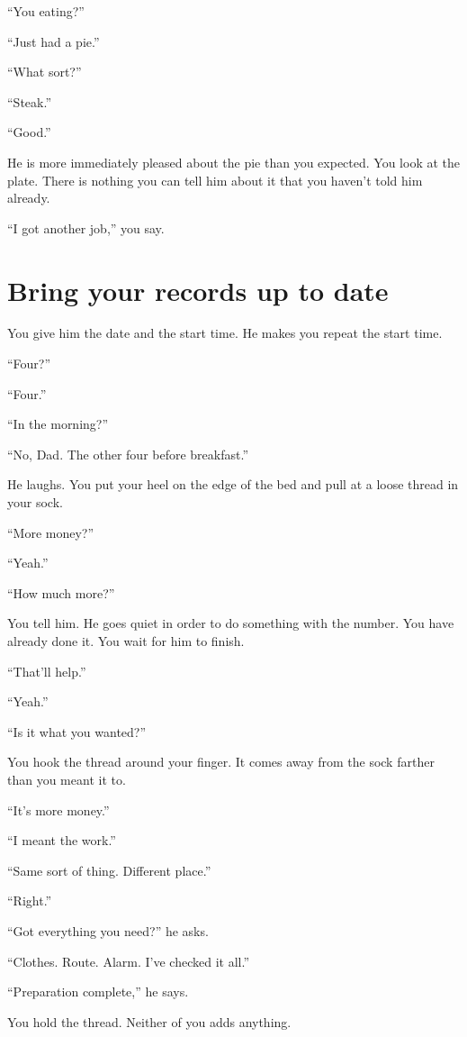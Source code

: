 \documentclass[11pt,oneside]{book}
\begin{document}
``You eating?''

``Just had a pie.''

``What sort?''

``Steak.''

``Good.''

He is more immediately pleased about the pie than you expected. You look at the plate. There is nothing you can tell him about it that you haven't told him already.

``I got another job,'' you say.

\section*{Bring your records up to date}

You give him the date and the start time. He makes you repeat the start time.

``Four?''

``Four.''

``In the morning?''

``No, Dad. The other four before breakfast.''

He laughs. You put your heel on the edge of the bed and pull at a loose thread in your sock.

``More money?''

``Yeah.''

``How much more?''

You tell him. He goes quiet in order to do something with the number. You have already done it. You wait for him to finish.

``That'll help.''

``Yeah.''

``Is it what you wanted?''

You hook the thread around your finger. It comes away from the sock farther than you meant it to.

``It's more money.''

``I meant the work.''

``Same sort of thing. Different place.''

``Right.''

``Got everything you need?'' he asks.

``Clothes. Route. Alarm. I've checked it all.''

``Preparation complete,'' he says.

You hold the thread. Neither of you adds anything.
\end{document}
